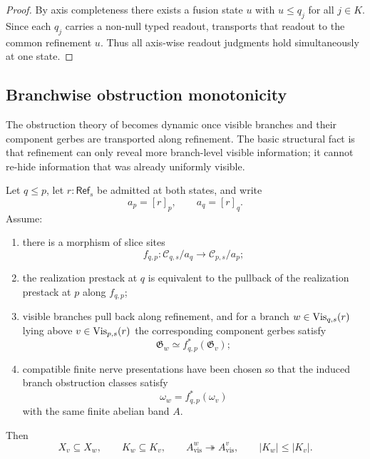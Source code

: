 \begin{proof}
By axis completeness there exists a fusion state $u$ with $u\le q_j$ for all $j\in K$. Since each $q_j$ carries a non-null typed readout,  transports that readout to the common refinement $u$. Thus all axis-wise readout judgments hold simultaneously at one state.
\end{proof}

\subsection{Branchwise obstruction monotonicity}

The obstruction theory of  becomes dynamic once visible branches and their component gerbes are transported along refinement. The basic structural fact is that refinement can only reveal more branch-level visible information; it cannot re-hide information that was already uniformly visible.

\begin{theorem}\label{thm:branch-visibility-monotonicity}
Let $q\le p$, let $r:\mathsf{Ref}_s$ be admitted at both states, and write
\[
a_p=[r]_p,
\qquad
a_q=[r]_q.
\]
Assume:
\begin{enumerate}[label=(\roman*),nosep]
\item there is a morphism of slice sites
\[
f_{q,p}:\mathcal C_{q,s}/a_q\to \mathcal C_{p,s}/a_p;
\]
\item the realization prestack at $q$ is equivalent to the pullback of the realization prestack at $p$ along $f_{q,p}$;
\item visible branches pull back along refinement, and for a branch $w\in \mathrm{Vis}_{q,s}(r)$ lying above $v\in \mathrm{Vis}_{p,s}(r)$ the corresponding component gerbes satisfy
\[
\mathfrak G_w\simeq f_{q,p}^*(\mathfrak G_v);
\]
\item compatible finite nerve presentations have been chosen so that the induced branch obstruction classes satisfy
\[
\omega_w=f_{q,p}^*(\omega_v)
\]
with the same finite abelian band $A$.
\end{enumerate}
Then
\[
X_v\subseteq X_w,
\qquad
K_w\subseteq K_v,
\qquad
A_{\mathrm{vis}}^w\twoheadrightarrow A_{\mathrm{vis}}^v,
\qquad
|K_w|\le |K_v|.
\]
\end{theorem}

